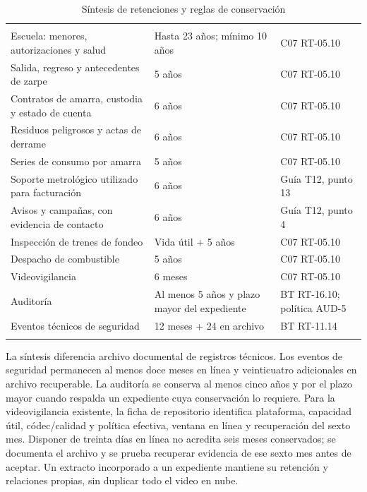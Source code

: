 \begingroup
\setlength{\tabcolsep}{3pt}
\begin{longtable}{@{}L{.53\textwidth}L{.29\textwidth}L{\dimexpr.18\textwidth-12pt\relax}@{}}
\caption{Síntesis de retenciones y reglas de conservación}\label{tab:sd5_retencion}\\
\hline
{} &  &  \\ \hline
\endfirsthead
\hline
{} &  &  \\ \hline
\endhead
Escuela: menores, autorizaciones y salud & Hasta 23 años; mínimo 10 años & C07 RT-05.10 \\ 
Salida, regreso y antecedentes de zarpe & 5 años & C07 RT-05.10 \\
Contratos de amarra, custodia y estado de cuenta & 6 años & C07 RT-05.10 \\
Residuos peligrosos y actas de derrame & 6 años & C07 RT-05.10 \\
Series de consumo por amarra & 5 años & C07 RT-05.10 \\
Soporte metrológico utilizado para facturación & 6 años & Guía T12, punto 13 \\
Avisos y campañas, con evidencia de contacto & 6 años & Guía T12, punto 4 \\
Inspección de trenes de fondeo & Vida útil + 5 años & C07 RT-05.10 \\
Despacho de combustible & 5 años & C07 RT-05.10 \\
Videovigilancia & 6 meses & C07 RT-05.10 \\
Auditoría & Al menos 5 años y plazo mayor del expediente & BT RT-16.10; política AUD-5 \\
Eventos técnicos de seguridad & 12 meses + 24 en archivo & BT RT-11.14 \\
\addlinespace \hline
\end{longtable}
\endgroup

La síntesis diferencia archivo documental de registros técnicos. Los eventos de seguridad permanecen al menos doce meses en línea y veinticuatro adicionales en archivo recuperable. La auditoría se conserva al menos cinco años y por el plazo mayor cuando respalda un expediente cuya conservación lo requiere. Para la videovigilancia existente, la ficha de repositorio identifica plataforma, capacidad útil, códec/calidad y política efectiva, ventana en línea y recuperación del sexto mes. Disponer de treinta días en línea no acredita seis meses conservados; se documenta el archivo y se prueba recuperar evidencia de ese sexto mes antes de aceptar. Un extracto incorporado a un expediente mantiene su retención y relaciones propias, sin duplicar todo el video en nube.


